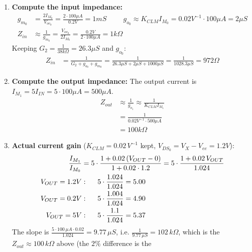 \begin{enumerate}
\begin{align*}
          &= \frac{5V - 1.2V}{100 \mu A} \\
          &= 38 k\Omega
    \end{align*}
  \item \textbf{Compute the input impedance:}
    \begin{align*}
      g_{m_0} &= \frac{2 I_{M_0}}{V_{ov_0}} = \frac{2 \cdot 100 \mu A}{0.2V} = 1 mS \hspace{1cm}
      g_{o_0} \approx K_{CLM} I_{M_0} = 0.02 V^{-1} \cdot 100 \mu A = 2 \mu S \\
      Z_{in} &\approx \frac{1}{g_{m_0}} = \frac{V_{ov_0}}{2 I_{M_0}} = \frac{0.2V}{2 \cdot 100 \mu A} = 1 k\Omega
    \end{align*}
    Keeping \(G_2 = \frac{1}{38 k\Omega} = 26.3 \mu S\) and \(g_{o_0}\):
    \begin{align*}
      Z_{in} &= \frac{1}{G_2 + g_{o_0} + g_{m_0}} = \frac{1}{26.3 \mu S + 2 \mu S + 1000 \mu S} = \frac{1}{1028.3 \mu S} = 972 \Omega
    \end{align*}
  \item \textbf{Compute the output impedance:} The output current is
    \(I_{M_1} = 5 I_{IN} = 5 \cdot 100 \mu A = 500 \mu A\).
    \begin{align*}
      Z_{out} &\approx \frac{1}{g_{o_1}} \approx \frac{1}{K_{CLM} I_{M_1}} \\
              &= \frac{1}{0.02 V^{-1} \cdot 500 \mu A} \\
              &= 100 k\Omega
    \end{align*}
  \item \textbf{Actual current gain} (\(K_{CLM} = 0.02\,V^{-1}\) kept,
    \(V_{DS_0} = V_X - V_{ee} = 1.2V\)):
    \begin{align*}
      \frac{I_{M_1}}{I_{M_0}} &= 5 \cdot \frac{1 + 0.02\,(V_{OUT} - 0)}{1 + 0.02 \cdot 1.2} = 5 \cdot \frac{1 + 0.02\,V_{OUT}}{1.024} \\
      V_{OUT} = 1.2V &: \hspace{0.5cm} 5 \cdot \frac{1.024}{1.024} = 5.00 \\
      V_{OUT} = 0.2V &: \hspace{0.5cm} 5 \cdot \frac{1.004}{1.024} = 4.90 \\
      V_{OUT} = 5V &: \hspace{0.5cm} 5 \cdot \frac{1.1}{1.024} = 5.37
    \end{align*}
    The slope is \(\frac{5 \cdot 100\,\mu A \cdot 0.02}{1.024} = 9.77\,\mu S\), i.e. \(\frac{1}{9.77\,\mu S} = 102\,k\Omega\),
    which is the \(Z_{out} \approx 100\,k\Omega\) above (the \(2\%\) difference is the

\end{enumerate}
